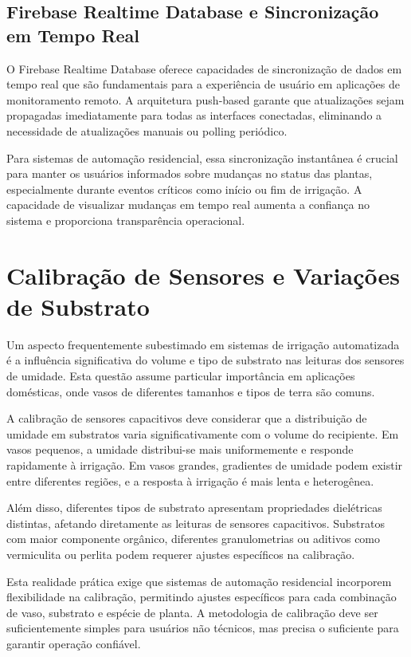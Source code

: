 \documentclass[twoside,english,brazilian]{UNISINOSmonografia}
\begin{document}
\subsection{Firebase Realtime Database e Sincronização em Tempo Real}

O Firebase Realtime Database oferece capacidades de sincronização de dados em tempo real que são fundamentais para a experiência de usuário em aplicações de monitoramento remoto. A arquitetura push-based garante que atualizações sejam propagadas imediatamente para todas as interfaces conectadas, eliminando a necessidade de atualizações manuais ou polling periódico.

Para sistemas de automação residencial, essa sincronização instantânea é crucial para manter os usuários informados sobre mudanças no status das plantas, especialmente durante eventos críticos como início ou fim de irrigação. A capacidade de visualizar mudanças em tempo real aumenta a confiança no sistema e proporciona transparência operacional.

\section{Calibração de Sensores e Variações de Substrato}

Um aspecto frequentemente subestimado em sistemas de irrigação automatizada é a influência significativa do volume e tipo de substrato nas leituras dos sensores de umidade. Esta questão assume particular importância em aplicações domésticas, onde vasos de diferentes tamanhos e tipos de terra são comuns.

A calibração de sensores capacitivos deve considerar que a distribuição de umidade em substratos varia significativamente com o volume do recipiente. Em vasos pequenos, a umidade distribui-se mais uniformemente e responde rapidamente à irrigação. Em vasos grandes, gradientes de umidade podem existir entre diferentes regiões, e a resposta à irrigação é mais lenta e heterogênea.

Além disso, diferentes tipos de substrato apresentam propriedades dielétricas distintas, afetando diretamente as leituras de sensores capacitivos. Substratos com maior componente orgânico, diferentes granulometrias ou aditivos como vermiculita ou perlita podem requerer ajustes específicos na calibração.

Esta realidade prática exige que sistemas de automação residencial incorporem flexibilidade na calibração, permitindo ajustes específicos para cada combinação de vaso, substrato e espécie de planta. A metodologia de calibração deve ser suficientemente simples para usuários não técnicos, mas precisa o suficiente para garantir operação confiável.
\end{document}
